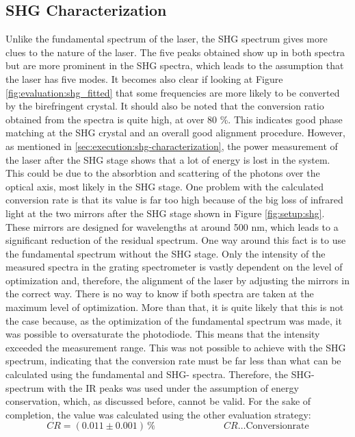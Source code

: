 \subsection{SHG Characterization}
Unlike the fundamental spectrum of the laser, the SHG spectrum gives more clues to the nature of the laser.
The five peaks obtained show up in both spectra but are more prominent in the SHG spectra, which leads to the assumption that the laser has five modes.
It becomes also clear if looking at Figure \ref{fig:evaluation:shg_fitted} that some frequencies are more likely to be converted by the birefringent crystal.
It should also be noted that the conversion ratio obtained from the spectra is quite high, at over 80 \%.
This indicates good phase matching at the SHG crystal and an overall good alignment procedure.
However, as mentioned in \ref{sec:execution:shg-characterization}, the power measurement of the laser after the SHG stage shows that a lot of energy is lost in the system.
This could be due to the absorbtion and scattering of the photons over the optical axis, most likely in the SHG stage.
One problem with the calculated conversion rate is that its value is far too high because of the big loss of infrared light at the two mirrors after the SHG stage shown in Figure \ref{fig:setup:shg}.
These mirrors are designed for wavelengths at around 500 nm, which leads to a significant reduction of the residual spectrum.
One way around this fact is to use the fundamental spectrum without the SHG stage.
Only the intensity of the measured spectra in the grating spectrometer is vastly dependent on the level of optimization and, therefore, the alignment of the laser by adjusting the mirrors in the correct way.
There is no way to know if both spectra are taken at the maximum level of optimization.
More than that, it is quite likely that this is not the case because, as the optimization of the fundamental spectrum was made, it was possible to oversaturate the photodiode.
This means that the intensity exceeded the measurement range.
This was not possible to achieve with the SHG spectrum, indicating that the conversion rate must be far less than what can be calculated using the fundamental and SHG- spectra.
Therefore, the SHG- spectrum with the IR peaks was used under the assumption of energy conservation, which, as discussed before, cannot be valid.
For the sake of completion, the value was calculated using the other evaluation strategy:
\begin{equation}
    CR = (0.011 \pm 0.001) \hspace{2pt} \% \hspace{3cm} CR \ldots \text{Conversionrate}
\end{equation} 


